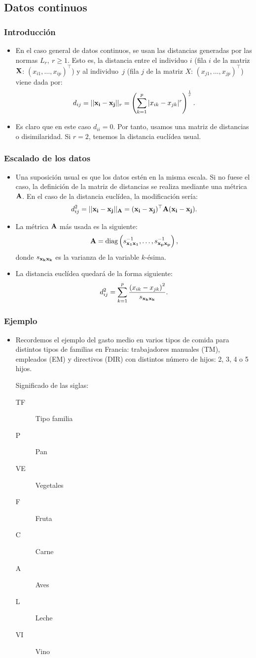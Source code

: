 \subsection{Datos continuos}
\begin{frame}
\frametitle{Introducción}
\begin{itemize}
\item<2->{En el caso general de datos continuos, se usan las distancias generadas por las normas $L_r,\ r\geq 1$. Esto es, la distancia entre el individuo $i$ (fila $i$ de la matriz $\mathbf{X}$: $(x_{i1},\ldots,x_{ip})^\top$) y al individuo~$j$ (fila $j$ de la matriz $X$: $(x_{j1},\ldots,x_{jp})^\top$) viene dada por:
$$
d_{ij}=||\mathbf{x_i} - \mathbf{x_j}||_r = \left(\sum_{k=1}^p |x_{ik} - x_{jk}|^r\right)^{\frac{1}{r}}.
$$
}
\item<3->{Es claro que en este caso $d_{ii}=0$. Por tanto, usamos una matriz de distancias o disimilaridad. Si $r=2$, tenemos la distancia euclídea usual.}
\end{itemize}
\end{frame}
\begin{frame}
\frametitle{Escalado de los datos}
\begin{itemize}
\item<2->{Una suposición usual es que los datos estén en la misma escala. Si no fuese el caso, la definición de la matriz de distancias se realiza mediante una métrica $\mathbf{A}$. En el caso de la distancia euclídea, la modificación sería: 
$$
d_{ij}^2=||\mathbf{x_i} - \mathbf{x_j}||_{\mathbf{A}} = (\mathbf{x_i} - \mathbf{x_j})^\top \mathbf{A} (\mathbf{x_i} - \mathbf{x_j}).
$$}
\item<3->{La métrica $\mathbf{A}$ más usada es la siguiente: 
$$
\mathbf{A}= \mbox{diag} \left( s_{\mathbf{x_1}\mathbf{x_1}}^{-1},\ldots,s_{\mathbf{x_p}\mathbf{x_p}}^{-1}
\right),
$$
donde $s_{\mathbf{x_k}\mathbf{x_k}}$ es la varianza de la variable $k$-ésima.}
\item<4->{La distancia euclídea quedará de la forma siguiente:
$$
d_{ij}^2 = \sum_{k=1}^p \frac{\left(x_{ik}-x_{jk}\right)^2}{s_{\mathbf{x_k}\mathbf{x_k}}}.
$$}
\end{itemize}
\end{frame}
\begin{frame}
\frametitle{Ejemplo}
\begin{itemize}
\item<2->{Recordemos el ejemplo del gasto medio en varios tipos de comida para distintos tipos de familias en Francia: trabajadores manuales (TM), empleados (EM) y directivos (DIR) con distintos número de hijos: 2, 3, 4 o 5 hijos.

Significado de las siglas:
\begin{description}
\item[TF] Tipo familia
\item[P] Pan
\item[VE] Vegetales
\item[F] Fruta
\item[C] Carne
\item[A] Aves
\item[L] Leche
\item[VI] Vino
\end{description}
}
\end{itemize}
\end{frame}
